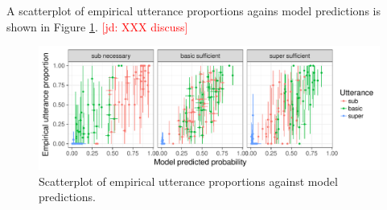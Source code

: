 \documentclass[11pt]{article}
\newcommand{\jd}[1]{\textcolor{Red}{[jd: #1]}}
\newcommand{\figref}[1]{Figure \ref{#1}}
\begin{document}
A scatterplot of empirical utterance proportions agains model predictions is shown in \figref{fig:nompredictives}. \jd{XXX discuss}


\begin{figure}
\centering
\includegraphics[width=\textwidth]{pics/exp3-empirical-predictives}
\caption{Scatterplot of empirical utterance proportions against model predictions.}
\label{fig:nompredictives}
\end{figure}





\end{document}
